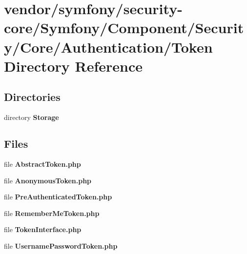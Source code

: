 \section{vendor/symfony/security-\/core/\+Symfony/\+Component/\+Security/\+Core/\+Authentication/\+Token Directory Reference}
\label{dir_3e66f0102900cc10ead125db0b2d8cb0}
\subsection*{Directories}
\begin{DoxyCompactItemize}
\item 
directory {\bf Storage}
\end{DoxyCompactItemize}
\subsection*{Files}
\begin{DoxyCompactItemize}
\item 
file {\bf Abstract\+Token.\+php}
\item 
file {\bf Anonymous\+Token.\+php}
\item 
file {\bf Pre\+Authenticated\+Token.\+php}
\item 
file {\bf Remember\+Me\+Token.\+php}
\item 
file {\bf Token\+Interface.\+php}
\item 
file {\bf Username\+Password\+Token.\+php}
\end{DoxyCompactItemize}

